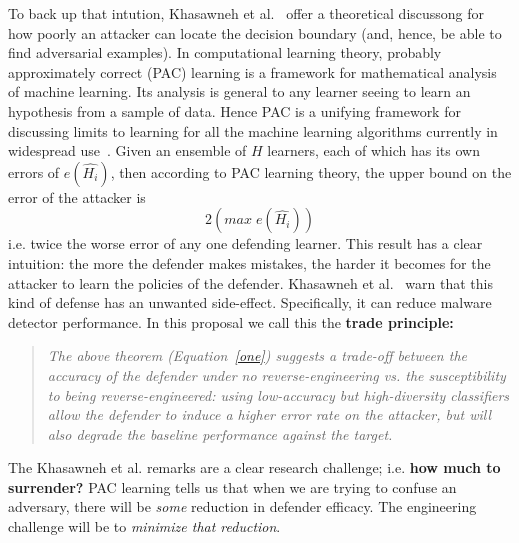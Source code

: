 \documentclass{NSF}
\begin{document}
\begin{nsfdescription}
To back up that intution, Khasawneh et al.~\cite{demontis2019adversarial}  offer a  theoretical discussong
for how poorly  an  attacker can locate    the decision boundary (and, hence, be  able
to find adversarial examples). In computational learning theory, probably approximately correct (PAC) learning is a framework for mathematical analysis of machine learning. Its analysis is general
  to any learner seeing to learn an hypothesis from a sample of data.
  Hence PAC is a unifying framework
  for discussing limits to learning
  for all the machine learning algorithms currently in widespread use~\cite{valiant84}.
  Given an ensemble of $H$ learners, each of which has its own errors of $e(\hat{H_i})$, then according to PAC learning theory, the  upper bound on the error of the attacker is 
\begin{equation}\label{one}
2(\mathit{max}\; e(\hat{H_i}))
\end{equation}
i.e. twice the worse error of any one defending learner. This result has a clear intuition: the more the defender makes mistakes, the harder it becomes for the attacker to learn the policies of the defender.  Khasawneh et al.~\cite{demontis2019adversarial} warn that    this kind of defense has an unwanted side-effect. Specifically, it can reduce malware detector performance.
In this proposal we call this the {\bf trade principle:}
\begin{quote}
{\em The above theorem (Equation~\ref{one})   suggests a trade-off between the accuracy of the defender under no reverse-engineering vs. the susceptibility to being reverse-engineered: using low-accuracy but high-diversity classifiers allow the defender to induce a higher error rate on the attacker, but will also degrade the baseline performance against the target. }
\end{quote}
 
The Khasawneh et al. remarks   are a  clear research challenge; i.e. {\bf how much to surrender?}
PAC learning tells us that when we are trying to confuse an adversary, there will be {\em some} reduction in defender efficacy. The engineering challenge will be to {\em minimize that reduction}.


\end{nsfdescription}
\end{document}
